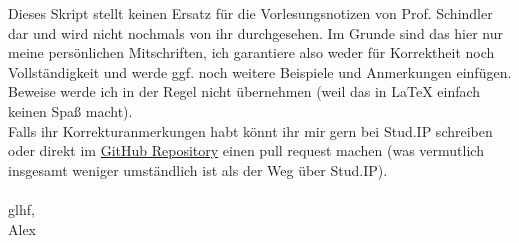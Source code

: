 \documentclass{jvfscript-de}
\begin{document}
\frontmatter
	\maketitle
	\tableofcontents
	\begingroup
	\let\clearpage\relax
	\listoffiles
	\endgroup
\newpage
\thispagestyle{plain}
Dieses Skript stellt keinen Ersatz für die Vorlesungsnotizen von Prof. Schindler dar und wird nicht nochmals von ihr durchgesehen. Im Grunde sind das hier nur meine persönlichen Mitschriften, ich garantiere also weder für Korrektheit noch Vollständigkeit und werde ggf. noch weitere Beispiele und Anmerkungen einfügen. Beweise werde ich in der Regel nicht übernehmen (weil das in \LaTeX{} einfach keinen Spaß macht).\\
Falls ihr Korrekturanmerkungen habt könnt ihr mir gern bei Stud.IP schreiben oder direkt im \href{https://github.com/vonfalkenstein/Vorlesungsmitschrift-Zahlentheorie}{GitHub Repository} einen pull request machen (was vermutlich insgesamt weniger umständlich ist als der Weg über Stud.IP).\\\\
glhf,\\
Alex


\mainmatter
	
	
	
	
	
	
	
	
	\printindex
\end{document}
